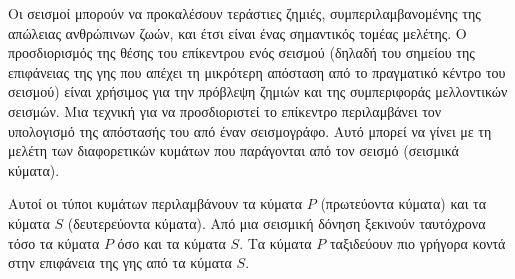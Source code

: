 \documentclass[11pt,a4paper,twoside]{book}
\begin{document}
Οι σεισμοί μπορούν να προκαλέσουν τεράστιες ζημιές, συμπεριλαμβανομένης της απώλειας ανθρώπινων ζωών, και έτσι είναι ένας σημαντικός τομέας μελέτης. Ο προσδιορισμός της θέσης του επίκεντρου ενός σεισμού (δηλαδή του σημείου της επιφάνειας της γης που απέχει τη μικρότερη απόσταση από το πραγματικό κέντρο του σεισμού) είναι χρήσιμος για την πρόβλεψη ζημιών και της συμπεριφοράς μελλοντικών σεισμών. Μια τεχνική για να προσδιοριστεί το επίκεντρο περιλαμβάνει τον υπολογισμό της απόστασής του από έναν σεισμογράφο. Αυτό μπορεί να γίνει με τη μελέτη των διαφορετικών κυμάτων που παράγονται από τον σεισμό (σεισμικά κύματα).

Αυτοί οι τύποι κυμάτων περιλαμβάνουν τα κύματα $P$ (πρωτεύοντα κύματα) και τα κύματα $S$ (δευτερεύοντα κύματα). Από μια σεισμική δόνηση ξεκινούν ταυτόχρονα τόσο τα κύματα $P$ όσο και τα κύματα $S$. Τα κύματα $P$ ταξιδεύουν πιο γρήγορα κοντά στην επιφάνεια της γης από τα κύματα $S$.
\end{document}
